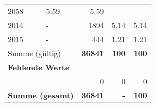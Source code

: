 \begin{longtable}{lXrrr}
       \num{2058} &
       \num[round-mode=places,round-precision=2]{5.59} &
         \num[round-mode=places,round-precision=2]{5.59} \\

     2014 &
     \multicolumn{1}{X}{ -  } &


       \num{1894} &
       \num[round-mode=places,round-precision=2]{5.14} &
         \num[round-mode=places,round-precision=2]{5.14} \\

     2015 &
     \multicolumn{1}{X}{ -  } &


       \num{444} &
       \num[round-mode=places,round-precision=2]{1.21} &
         \num[round-mode=places,round-precision=2]{1.21} \\
     \midrule
     \multicolumn{2}{l}{Summe (gültig)} &
       \textbf{\num{36841}} &
     \textbf{\num{100}} &
       \textbf{\num[round-mode=places,round-precision=2]{100}} \\
     \multicolumn{5}{l}{\textbf{Fehlende Werte}}\\
      & & 0 & 0 & 0 \\
     \midrule
     \multicolumn{2}{l}{\textbf{Summe (gesamt)}} &
          \textbf{\num{36841}} &
        \textbf{-} &
        \textbf{\num{100}} \\
     \bottomrule
     \end{longtable}
     
